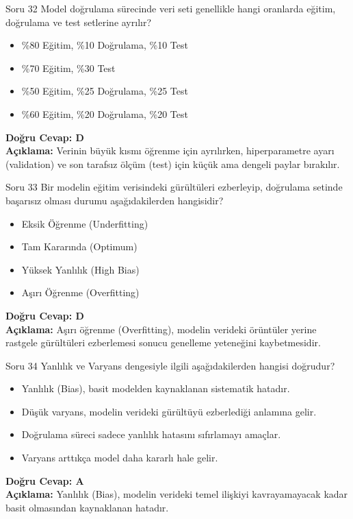 \documentclass[12pt,a4paper]{article}
\begin{document}
\begin{testcard}{Soru 32}
    Model doğrulama sürecinde veri seti genellikle hangi oranlarda eğitim, doğrulama ve test setlerine ayrılır?
    \begin{itemize}
        \item[A)] \%80 Eğitim, \%10 Doğrulama, \%10 Test
        \item[B)] \%70 Eğitim, \%30 Test
        \item[C)] \%50 Eğitim, \%25 Doğrulama, \%25 Test
        \item[D)] \%60 Eğitim, \%20 Doğrulama, \%20 Test
    \end{itemize}
    \tcblower
    \textbf{Doğru Cevap: D} \\
    \textbf{Açıklama:} Verinin büyük kısmı öğrenme için ayrılırken, hiperparametre ayarı (validation) ve son tarafsız ölçüm (test) için küçük ama dengeli paylar bırakılır.
\end{testcard}

\begin{testcard}{Soru 33}
    Bir modelin eğitim verisindeki gürültüleri ezberleyip, doğrulama setinde başarısız olması durumu aşağıdakilerden hangisidir?
    \begin{itemize}
        \item[A)] Eksik Öğrenme (Underfitting)
        \item[B)] Tam Kararında (Optimum)
        \item[C)] Yüksek Yanlılık (High Bias)
        \item[D)] Aşırı Öğrenme (Overfitting)
    \end{itemize}
    \tcblower
    \textbf{Doğru Cevap: D} \\
    \textbf{Açıklama:} Aşırı öğrenme (Overfitting), modelin verideki örüntüler yerine rastgele gürültüleri ezberlemesi sonucu genelleme yeteneğini kaybetmesidir.
\end{testcard}

\begin{testcard}{Soru 34}
    Yanlılık ve Varyans dengesiyle ilgili aşağıdakilerden hangisi doğrudur?
    \begin{itemize}
        \item[A)] Yanlılık (Bias), basit modelden kaynaklanan sistematik hatadır.
        \item[B)] Düşük varyans, modelin verideki gürültüyü ezberlediği anlamına gelir.
        \item[C)] Doğrulama süreci sadece yanlılık hatasını sıfırlamayı amaçlar.
        \item[D)] Varyans arttıkça model daha kararlı hale gelir.
    \end{itemize}
    \tcblower
    \textbf{Doğru Cevap: A} \\
    \textbf{Açıklama:} Yanlılık (Bias), modelin verideki temel ilişkiyi kavrayamayacak kadar basit olmasından kaynaklanan hatadır.
\end{testcard}
\end{document}
